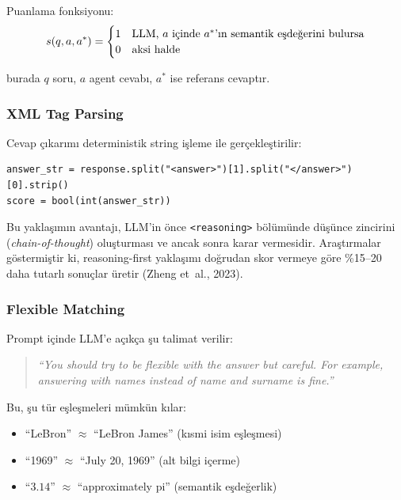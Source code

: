 Puanlama fonksiyonu:
\begin{equation}
\label{eq:binary-score}
s(q, a, a^{*}) =
\begin{cases}
1 & \text{LLM, } a \text{ i\c{c}inde } a^{*}\text{'{\i}n semantik e\c{s}de\u{g}erini bulursa} \\
0 & \text{aksi halde}
\end{cases}
\end{equation}

\noindent burada $q$ soru, $a$ agent cevab{\i}, $a^{*}$ ise referans cevapt{\i}r.

\subsubsection{XML Tag Parsing}

Cevap \c{c}{\i}kar{\i}m{\i} deterministik string i\c{s}leme ile ger\c{c}ekle\c{s}tirilir:

\begin{verbatim}
answer_str = response.split("<answer>")[1].split("</answer>")[0].strip()
score = bool(int(answer_str))
\end{verbatim}

Bu yakla\c{s}{\i}m{\i}n avantaj{\i}, LLM'in \"{o}nce \texttt{<reasoning>} b\"{o}l\"{u}m\"{u}nde d\"{u}\c{s}\"{u}nce zincirini (\emph{chain-of-thought}) olu\c{s}turmas{\i} ve ancak sonra karar vermesidir. Ara\c{s}t{\i}rmalar g\"{o}stermi\c{s}tir ki, reasoning-first yakla\c{s}{\i}m{\i} do\u{g}rudan skor vermeye g\"{o}re \%15--20 daha tutarl{\i} sonu\c{c}lar \"{u}retir (Zheng et~al., 2023).

\subsubsection{Flexible Matching}

Prompt i\c{c}inde LLM'e a\c{c}{\i}k\c{c}a \c{s}u talimat verilir:

\begin{quote}
\emph{``You should try to be flexible with the answer but careful. For example, answering with names instead of name and surname is fine.''}
\end{quote}

Bu, \c{s}u t\"{u}r e\c{s}le\c{s}meleri m\"{u}mk\"{u}n k{\i}lar:
\begin{itemize}
  \item ``LeBron'' $\approx$ ``LeBron James'' (k{\i}smi isim e\c{s}le\c{s}mesi)
  \item ``1969'' $\approx$ ``July 20, 1969'' (alt bilgi i\c{c}erme)
  \item ``$3.14$'' $\approx$ ``approximately pi'' (semantik e\c{s}de\u{g}erlik)
\end{itemize}

